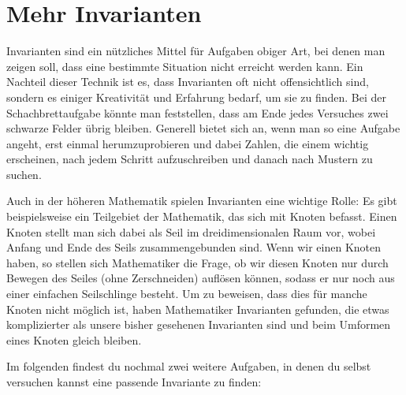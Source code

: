 \documentclass[a4paper,ngerman,12pt]{scrartcl}
\theoremstyle{definition}
\theoremstyle{plain}
\theoremstyle{remark}
\begin{document}
\section{Mehr Invarianten}

Invarianten sind ein nützliches Mittel für Aufgaben obiger Art, bei denen man zeigen soll, dass eine bestimmte Situation nicht erreicht werden kann. Ein Nachteil dieser Technik ist es, dass Invarianten oft nicht offensichtlich sind, sondern es einiger Kreativität und Erfahrung bedarf, um sie zu finden. Bei der Schachbrettaufgabe könnte man feststellen, dass am Ende jedes Versuches zwei schwarze Felder übrig bleiben. Generell bietet sich an, wenn man so eine Aufgabe angeht, erst einmal herumzuprobieren und dabei Zahlen, die einem wichtig erscheinen, nach jedem Schritt aufzuschreiben und danach nach Mustern zu suchen.

Auch in der höheren Mathematik spielen Invarianten eine wichtige Rolle: Es gibt beispielsweise ein Teilgebiet der Mathematik, das sich mit Knoten befasst. Einen Knoten stellt man sich dabei als Seil im dreidimensionalen Raum vor, wobei Anfang und Ende des Seils zusammengebunden sind. Wenn wir einen Knoten haben, so stellen sich Mathematiker die Frage, ob wir diesen Knoten nur durch Bewegen des Seiles (ohne Zerschneiden) auflösen können, sodass er nur noch aus einer einfachen Seilschlinge besteht. Um zu beweisen, dass dies für manche Knoten nicht möglich ist, haben Mathematiker Invarianten gefunden, die etwas komplizierter als unsere bisher gesehenen Invarianten sind und beim Umformen eines Knoten gleich bleiben.

Im folgenden findest du nochmal zwei weitere Aufgaben, in denen du selbst versuchen kannst eine passende Invariante zu finden:
\end{document}
